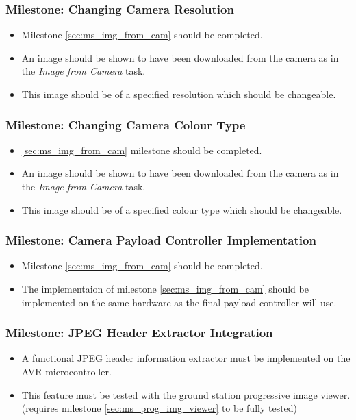 	\subsubsection{Milestone: Changing Camera Resolution}
		\label{sec:ms_img_cam_change_res}
		\begin{itemize}
			\item 	Milestone \ref{sec:ms_img_from_cam} should be completed.
			\item 	An image should be shown to have been downloaded 
				from the camera as in the \emph{Image from Camera}
				task.
			\item 	This image should be of a specified resolution which
				should be changeable.
		\end{itemize}

	\subsubsection{Milestone: Changing Camera Colour Type}
		\label{sec:ms_img_cam_change_colour_type}
		\begin{itemize}
			\item 	\ref{sec:ms_img_from_cam} milestone should be completed.
			\item 	An image should be shown to have been downloaded 
				from the camera as in the \emph{Image from Camera}
				task.
			\item 	This image should be of a specified colour type which
				should be changeable.
		\end{itemize}

	\subsubsection{Milestone: Camera Payload Controller Implementation}
		\label{sec:ms_img_cam_controller_implementation}
		\begin{itemize}
			\item 	Milestone \ref{sec:ms_img_from_cam} should be completed.
			\item 	The implementaion of milestone \ref{sec:ms_img_from_cam} 
				should be implemented on the same hardware as the final
				payload controller will use.
		\end{itemize}

	\subsubsection{Milestone: JPEG Header Extractor Integration}
		\label{sec:ms_jpg_extractor}
		\begin{itemize}
			\item 	A functional JPEG header information extractor must be implemented
				on the AVR microcontroller. 
			\item 	This feature must be tested with
				the ground station progressive image viewer. (requires
				milestone \ref{sec:ms_prog_img_viewer} to be fully tested)
		\end{itemize}


